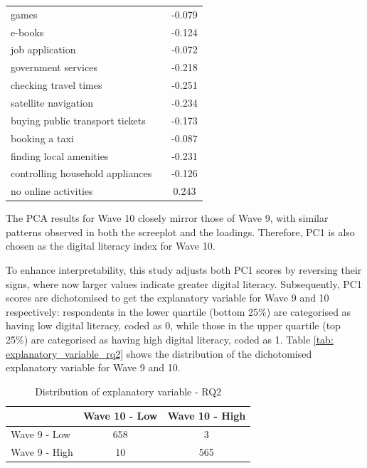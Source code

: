 \begin{table}
\begin{subtable}[t]{0.4\textwidth}
\begin{tabular}{llc}
                games &  & -0.079 \\
                e-books &  & -0.124 \\
                job application &  & -0.072 \\
                government services &  & -0.218 \\
                checking travel times &  & -0.251 \\
                satellite navigation &  & -0.234 \\
                buying public transport tickets &  & -0.173 \\
                booking a taxi &  & -0.087 \\
                finding local amenities &  & -0.231 \\
                controlling household appliances &  & -0.126 \\
                no online activities &  & 0.243 \\
                \bottomrule
            \end{tabular}
        \end{subtable}
\end{table}

The PCA results for Wave 10 closely mirror those of Wave 9, with similar patterns observed in both the screeplot and the loadings. Therefore, PC1 is also chosen as the digital literacy index for Wave 10.

To enhance interpretability, this study adjusts both PC1 scores by reversing their signs, where now larger values indicate greater digital literacy. Subsequently, PC1 scores are dichotomised to get the explanatory variable for Wave 9 and 10 respectively: respondents in the lower quartile (bottom 25\%) are categorised as having low digital literacy, coded as 0, while those in the upper quartile (top 25\%) are categorised as having high digital literacy, coded as 1. Table \ref{tab: explanatory_variable_rq2} shows the distribution of the dichotomised explanatory variable for Wave 9 and 10.

\begin{table}[h!]
    \centering
    \caption{Distribution of explanatory variable - RQ2}
    \label{tab:explanatory_variable_rq2}
    \begin{tabular}{lcc}
        \toprule
         & Wave 10 - Low & Wave 10 - High \\
        \midrule
        Wave 9 - Low & 658 & 3 \\
        Wave 9 - High & 10 & 565 \\
        \bottomrule
    \end{tabular}
\end{table}

